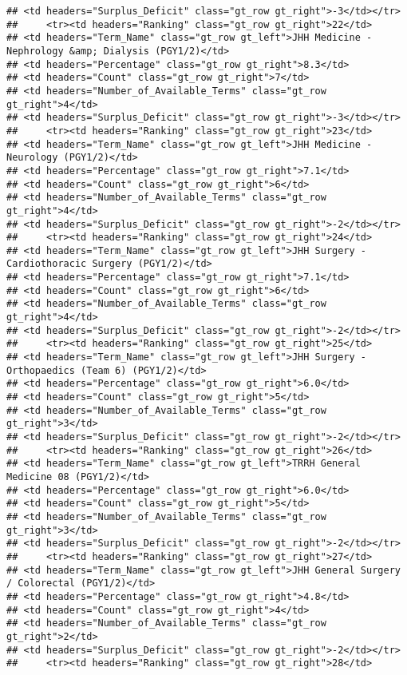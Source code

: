 \documentclass[
]{article}
\begin{document}
\begin{verbatim}
## <td headers="Surplus_Deficit" class="gt_row gt_right">-3</td></tr>
##     <tr><td headers="Ranking" class="gt_row gt_right">22</td>
## <td headers="Term_Name" class="gt_row gt_left">JHH Medicine - Nephrology &amp; Dialysis (PGY1/2)</td>
## <td headers="Percentage" class="gt_row gt_right">8.3</td>
## <td headers="Count" class="gt_row gt_right">7</td>
## <td headers="Number_of_Available_Terms" class="gt_row gt_right">4</td>
## <td headers="Surplus_Deficit" class="gt_row gt_right">-3</td></tr>
##     <tr><td headers="Ranking" class="gt_row gt_right">23</td>
## <td headers="Term_Name" class="gt_row gt_left">JHH Medicine - Neurology (PGY1/2)</td>
## <td headers="Percentage" class="gt_row gt_right">7.1</td>
## <td headers="Count" class="gt_row gt_right">6</td>
## <td headers="Number_of_Available_Terms" class="gt_row gt_right">4</td>
## <td headers="Surplus_Deficit" class="gt_row gt_right">-2</td></tr>
##     <tr><td headers="Ranking" class="gt_row gt_right">24</td>
## <td headers="Term_Name" class="gt_row gt_left">JHH Surgery - Cardiothoracic Surgery (PGY1/2)</td>
## <td headers="Percentage" class="gt_row gt_right">7.1</td>
## <td headers="Count" class="gt_row gt_right">6</td>
## <td headers="Number_of_Available_Terms" class="gt_row gt_right">4</td>
## <td headers="Surplus_Deficit" class="gt_row gt_right">-2</td></tr>
##     <tr><td headers="Ranking" class="gt_row gt_right">25</td>
## <td headers="Term_Name" class="gt_row gt_left">JHH Surgery - Orthopaedics (Team 6) (PGY1/2)</td>
## <td headers="Percentage" class="gt_row gt_right">6.0</td>
## <td headers="Count" class="gt_row gt_right">5</td>
## <td headers="Number_of_Available_Terms" class="gt_row gt_right">3</td>
## <td headers="Surplus_Deficit" class="gt_row gt_right">-2</td></tr>
##     <tr><td headers="Ranking" class="gt_row gt_right">26</td>
## <td headers="Term_Name" class="gt_row gt_left">TRRH General Medicine 08 (PGY1/2)</td>
## <td headers="Percentage" class="gt_row gt_right">6.0</td>
## <td headers="Count" class="gt_row gt_right">5</td>
## <td headers="Number_of_Available_Terms" class="gt_row gt_right">3</td>
## <td headers="Surplus_Deficit" class="gt_row gt_right">-2</td></tr>
##     <tr><td headers="Ranking" class="gt_row gt_right">27</td>
## <td headers="Term_Name" class="gt_row gt_left">JHH General Surgery / Colorectal (PGY1/2)</td>
## <td headers="Percentage" class="gt_row gt_right">4.8</td>
## <td headers="Count" class="gt_row gt_right">4</td>
## <td headers="Number_of_Available_Terms" class="gt_row gt_right">2</td>
## <td headers="Surplus_Deficit" class="gt_row gt_right">-2</td></tr>
##     <tr><td headers="Ranking" class="gt_row gt_right">28</td>

\end{verbatim}
\end{document}
